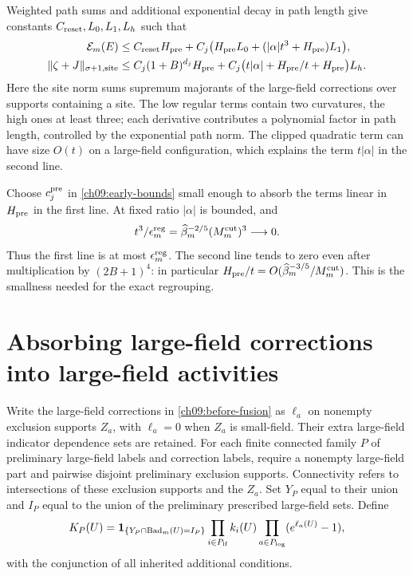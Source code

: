 Weighted path sums and additional exponential decay in path length give constants
$C_{\rm reset},L_0,L_1,L_h$ such that
\begin{align}
 \mathcal E_m(E)&\le C_{\rm reset}H_{\rm pre}
     +C_j\bigl(H_{\rm pre}L_0+
                  (|\alpha|t^3+H_{\rm pre})L_1\bigr),\\
 \|\zeta+J\|_{\sigma+1,{\rm site}}
 &\le C_j(1+B)^{d_j}H_{\rm pre}
   +C_j\bigl(t|\alpha|+H_{\rm pre}/t+H_{\rm pre}\bigr)L_h .
 \label{ch09:reset-cost}
\end{align}
Here the site norm sums supremum majorants of the large-field
corrections over supports containing a site.
The low regular terms contain two curvatures, the high
ones at least three; each derivative contributes a polynomial factor
in path length, controlled by the exponential path norm.
The clipped quadratic term can have size $O(t)$ on a
large-field configuration, which explains the term
$t|\alpha|$ in the second line.

Choose $c_j^{\rm pre}$ in \eqref{ch09:early-bounds}
small enough to absorb the terms linear in $H_{\rm pre}$
in the first line. At fixed ratio $|\alpha|$ is bounded,
and
\[
 t^3/\epsilon_m^{\rm reg}
       =\widehat\beta_m^{-2/5}(M_m^{\rm cut})^3\longrightarrow0.
\]
Thus the first line is at most $\epsilon_m^{\rm reg}$.
The second line tends to zero even after multiplication
by $(2B+1)^4$: in particular
$H_{\rm pre}/t=O(\widehat\beta_m^{-3/5}/M_m^{\rm cut})$.
This is the smallness needed for the exact regrouping.

\section{Absorbing large-field corrections into large-field activities}
\label{ch09:fusion}

Write the large-field corrections in
\eqref{ch09:before-fusion} as $\ell_a$ on nonempty exclusion
supports $Z_a$, with $\ell_a=0$ when $Z_a$ is small-field.
Their extra large-field indicator dependence sets are retained.
For each finite connected family $P$ of preliminary
large-field labels and correction labels, require a
nonempty large-field part and pairwise disjoint preliminary
exclusion supports. Connectivity refers to intersections
of these exclusion supports and the $Z_a$.
Set $Y_P$ equal to their union and $I_P$ equal to the union
of the preliminary prescribed large-field sets. Define
\[
 K_P(U)=\mathbf1_{\{Y_P\cap\operatorname{Bad}_m(U)=I_P\}}
     \prod_{i\in P_{\rm lf}}k_i(U)
     \prod_{a\in P_{\log}}(e^{\ell_a(U)}-1),
\]
with the conjunction of all inherited additional conditions.

